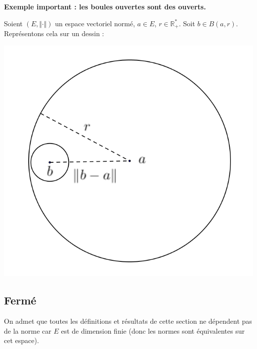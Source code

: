 \documentclass[french,11pt,twoside]{VcCours}
\begin{document}
\medskip

\textbf{Exemple important : les boules ouvertes sont des ouverts.}

Soient $(E, \Vert \cdot \Vert)$ un espace vectoriel normé, $a \in E$, $r \in \mathbb{R}_+^*$. Soit $b \in B(a,r)$. Représentons cela sur un dessin :

\begin{center}
\includegraphics[scale=0.4]{BouleOuv}
\end{center}

\vspace{4cm}

%

\subsection{Fermé}

\begin{Theoreme}{} On admet que toutes les définitions et résultats de cette section ne dépendent pas de la norme car $E$ est de dimension finie (donc les normes sont équivalentes sur cet espace).
\end{Theoreme}
\end{document}
